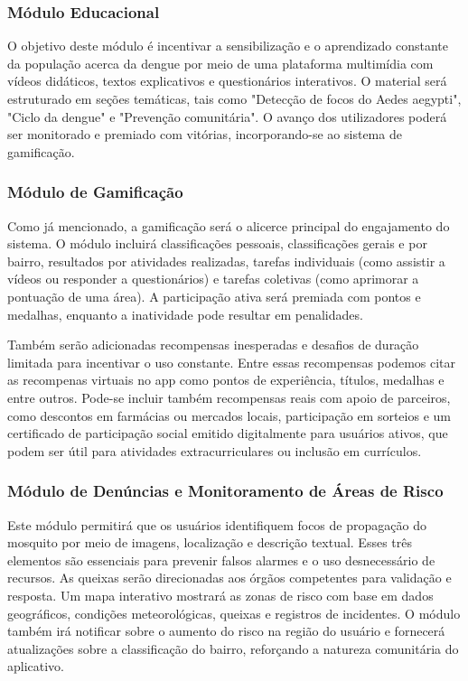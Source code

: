 \documentclass[a5paper, 12pt]{article}
\begin{document}
\subsubsection{Módulo Educacional}

O objetivo deste módulo é incentivar a sensibilização e o aprendizado constante da população acerca da dengue por meio de uma plataforma multimídia com vídeos didáticos, textos explicativos e questionários interativos.  O material será estruturado em seções temáticas, tais como "Detecção de focos do Aedes aegypti", "Ciclo da dengue" e "Prevenção comunitária".  O avanço dos utilizadores poderá ser monitorado e premiado com vitórias, incorporando-se ao sistema de gamificação.

\subsubsection{Módulo de Gamificação}

Como já mencionado, a gamificação será o alicerce principal do engajamento do sistema.  O módulo incluirá classificações pessoais, classificações gerais e por bairro, resultados por atividades realizadas, tarefas individuais (como assistir a vídeos ou responder a questionários) e tarefas coletivas (como aprimorar a pontuação de uma área).  A participação ativa será premiada com pontos e medalhas, enquanto a inatividade pode resultar em penalidades.  
\par Também serão adicionadas recompensas inesperadas e desafios de duração limitada para incentivar o uso constante. Entre essas recompensas podemos citar as recompenas virtuais no app como pontos de experiência, títulos, medalhas e entre outros. Pode-se incluir também recompensas reais com apoio de parceiros, como descontos em farmácias ou mercados locais, participação em sorteios e um certificado de participação social emitido digitalmente para usuários ativos, que podem ser útil para atividades extracurriculares ou inclusão em currículos.

\subsubsection{Módulo de Denúncias e Monitoramento de Áreas de Risco}

Este módulo permitirá que os usuários identifiquem focos de propagação do mosquito por meio de imagens, localização e descrição textual. Esses três elementos são essenciais para prevenir falsos alarmes e o uso desnecessário de recursos.   As queixas serão direcionadas aos órgãos competentes para validação e resposta.   Um mapa interativo mostrará as zonas de risco com base em dados geográficos, condições meteorológicas, queixas e registros de incidentes.   O módulo também irá notificar sobre o aumento do risco na região do usuário e fornecerá atualizações sobre a classificação do bairro, reforçando a natureza comunitária do aplicativo.
\end{document}
